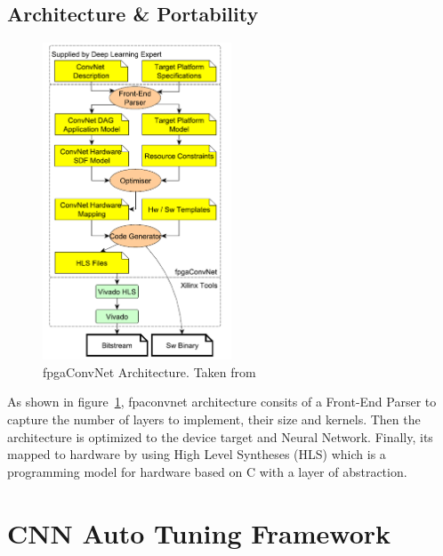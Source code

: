\subsection{Architecture \& Portability}

\begin{figure}[!htbp]
    \centering
    \includegraphics[width=0.5\textwidth]{Figures/fpgaconvnet.png}
    \caption{fpgaConvNet Architecture. Taken from~\cite{fpgaconvnet}}
    \label{figure:fpgaconvnet}
\end{figure}

As shown in figure~\ref{figure:fpgaconvnet}, fpaconvnet architecture consits of a Front-End Parser to capture
the number of layers to implement, their size and kernels. Then the architecture is optimized to the device target and Neural Network.
Finally, its mapped to hardware by using High Level Syntheses (HLS) which is a programming model for hardware based on C with a layer of abstraction.
\newpage
\section{CNN Auto Tuning Framework}
\label{section:autotuning}
